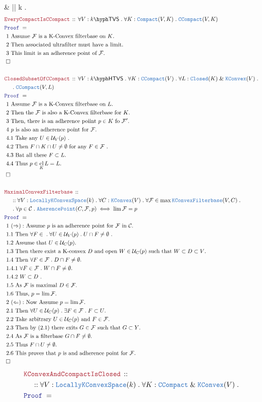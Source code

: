 \documentclass[12pt]{scrartcl}
\newcommand{\TYPE}[1]{\textcolor{NavyBlue}{\mathtt{#1}}}
\newcommand{\LOGIC}[1]{\textcolor{Blue}{\mathtt{#1}}}
\newcommand{\THM}[1]{\textcolor{Maroon}{\mathtt{#1}}}
\renewcommand{\.}{\; . \;}
\newcommand{\Theorem}[2]{& \THM{#1} \, :: \, #2 \\ & \Proof = \\ }
\newcommand{\NewLine}{\\ & \kern 1pc}
\newcommand{\Page}[1]{ \begin{align*} #1 \end{align*}   }
\newcommand{\Explain}[1]{& \text{#1.} \\}
\renewcommand{\And}{\; \& \;}
\newcommand{\QED}{\; \square}
\newcommand{\EndProof}{& \QED \\}
\newcommand{\Proof}{\LOGIC{Proof} \; }
\renewcommand{\C}{\mathcal{C}}
\newcommand{\Closed}{\TYPE{Closed}}
\newcommand{\Compact}{\TYPE{Compact}}
\DeclareMathOperator*{\cl}{cl}
\renewcommand{\U}{\mathcal{U}}
\newcommand{\F}{\mathcal{F}}
\newcommand{\KC}{\TYPE{KConvex}}
\newcommand{\LKConv}{\TYPE{LocallyKConvexSpace}}
\newcommand{\CCompact}{\TYPE{CCompact}}
\newcommand{\TVS}[1]{{#1}\hyph\mathsf{TVS}}
\newcommand{\HTVS}[1]{{#1}\hyph\mathsf{HTVS}}
\begin{document}
{{	} 
	\\
	& |\cdot| \neq  \Lambda \alpha \in k \. [\alpha \neq 0] \\ 
}\Page{
	\Theorem{EveryCompactIsCCompact}
	{
		\forall V : \TVS{k} \. 
		\forall K : \Compact(V,K) \.
		 \CCompact(V,K)
	}
	\Explain{ 1 Assume $\F$ is a K-Convex filterbase on $K$}
	\Explain{ 2 Then associated ultrafilter must have a limit}
	\Explain{ 3 This limit is an adherence point of $\F$}
	\EndProof
	\\
	\Theorem{ClosedSubsetOfCCompact}
	{	
		\forall V : \HTVS{k} \.
		\forall K  : \CCompact(V) \.
		\forall L : \Closed(K) \And \KC(V) \. \NewLine \.
		\CCompact(V,L)
	}
	\Explain{ 1 Assume $\F$ is a K-Convex filterbase on $L$}
	\Explain{ 2 Then the $\F$ is also a K-Convex filterbase for $K$}
	\Explain{ 3 Then, there is an adherence poiint $p \in K$ fo $\F'$}
	\Explain{ 4 $p$ is also an adherence point for $\F$}
	\Explain{ 4.1  Take any $U \in \U_V(p)$  }
	\Explain{ 4.2  Then $F \cap K \cap U \neq \emptyset$ for any $F \in \F$ }
	\Explain{ 4.3  Bat  all these $F \subset L$}
	\Explain{ 4.4 Thus $p \in \cl_K L = L$}
	\EndProof
	\\
	\Theorem{MaximalConvexFilterbase}
	{
		\NewLine :: 			
		\forall V : \LKConv(k) \.
		\forall C : \KC(V) \.
		\forall \F \in \max \TYPE{KConvexFilterbase}(V,C) \. \NewLine \.
		\forall p \in \C \.
		\TYPE{AherencePoint}(C,\F, p)
		\iff
		\lim \F = p
	}
	\Explain{ 1  $(\Rightarrow):$ Assume $p$ is an adherence point for $\F$ in $\C$}
	\Explain{ 1.1 Then $\forall F \in \. \forall U \in \U_V(p) \. U \cap F \neq \emptyset$ }
	\Explain{ 1.2 Assume that $U \in \U_C(p)$}
	\Explain{ 1.3 Then there exist a K-convex $D$ and open $W \in \U_C(p)$ 
	such that $W \subset D \subset V$}
	\Explain{ 1.4 Then $\forall F \in \F \.  D \cap F  \neq \emptyset$}
	\Explain{ 1.4.1 $\forall F \in \F \.  W \cap F \neq \emptyset$}
	\Explain{ 1.4.2 $W \subset D$ }
	\Explain{ 1.5 As $\F$ is maximal $D \in \F$}
	\Explain{ 1.6 Thus, $p = \lim \F$}
	\Explain{ 2 $(\Leftarrow):$ Now Assume $p = \lim \F$}
	\Explain{ 2.1 Then  $\forall U \in \U_C(p) \. \exists F \in \F \. F \subset U$}
	\Explain{ 2.2 Take arbitrary $U \in \U_C(p)$ and $F \in \F$}
	\Explain{ 2.3 Then by $(2.1)$ there exits $G \in \F$ such that $G \subset Y$}
	\Explain{ 2.4 As $\F$ is a filterbase $G \cap F \neq \emptyset$}
	\Explain{ 2.5 Thus $F \cap U \neq \emptyset$}
	\Explain{ 2.6 This proves that $p$ is and adherence point for $\F$}
	\EndProof
}\Page{
	\Theorem{KConvexAndCcompactIsClosed}
	{
		\NewLine ::		
		\forall V : \LKConv(k) \.
		\forall K : \CCompact \And \KC(V) \.
}}
\end{document}
